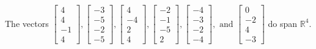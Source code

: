 \begin{exercise}
\begin{exerciseStatement}
  \end{exerciseStatement}
  \begin{exerciseAnswer}
   The vectors \(\left[\begin{array}{r}
4 \\
4 \\
-1 \\
4
\end{array}\right] , \left[\begin{array}{r}
-3 \\
-5 \\
-2 \\
-5
\end{array}\right] , \left[\begin{array}{r}
4 \\
-4 \\
2 \\
4
\end{array}\right] , \left[\begin{array}{r}
-2 \\
-1 \\
-5 \\
2
\end{array}\right] , \left[\begin{array}{r}
-4 \\
-3 \\
-2 \\
-4
\end{array}\right] , \text{ and } \left[\begin{array}{r}
0 \\
-2 \\
4 \\
-3
\end{array}\right]\) 
  	 do  
	span \(\mathbb{R}^4\).
  


  \end{exerciseAnswer}
\end{exercise}